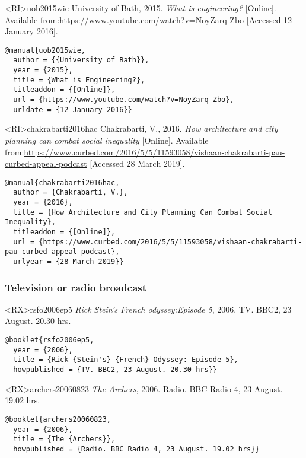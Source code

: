 \documentclass[10pt,a4paper]{article}
\begin{document}
\begin{bibexbox}<RI>{uob2015wie}
   University of Bath, 2015. \emph{What is engineering?} [Online]. Available from:\@ \url{https://www.youtube.com/watch?v=NoyZarq-Zbo} [Accessed 12 January 2016].
  \tcblower
\begin{Verbatim}
@manual{uob2015wie,
  author = {{University of Bath}},
  year = {2015},
  title = {What is Engineering?},
  titleaddon = {[Online]},
  url = {https://www.youtube.com/watch?v=NoyZarq-Zbo},
  urldate = {12 January 2016}}
\end{Verbatim}
\end{bibexbox}

\begin{bibexbox}<RI>{chakrabarti2016hac}
   Chakrabarti, V., 2016. \emph{How architecture and city planning can combat social inequality} [Online]. Available from:\@ \url{https://www.curbed.com/2016/5/5/11593058/vishaan-chakrabarti-pau-curbed-appeal-podcast} [Accessed 28 March 2019].
  \tcblower
\begin{Verbatim}
@manual{chakrabarti2016hac,
  author = {Chakrabarti, V.},
  year = {2016},
  title = {How Architecture and City Planning Can Combat Social Inequality},
  titleaddon = {[Online]},
  url = {https://www.curbed.com/2016/5/5/11593058/vishaan-chakrabarti-pau-curbed-appeal-podcast},
  urlyear = {28 March 2019}}
\end{Verbatim}
\end{bibexbox}

\subsubsection*{Television or radio broadcast}

\begin{bibexbox}<RX>{rsfo2006ep5}
  \emph{Rick Stein's French odyssey:\@ Episode 5}, 2006. TV. BBC2, 23 August. 20.30 hrs.
  \tcblower
\begin{Verbatim}
@booklet{rsfo2006ep5,
  year = {2006},
  title = {Rick {Stein's} {French} Odyssey: Episode 5},
  howpublished = {TV. BBC2, 23 August. 20.30 hrs}}
\end{Verbatim}
\end{bibexbox}

\begin{bibexbox}<RX>{archers20060823}
  \emph{The Archers}, 2006. Radio. BBC Radio 4, 23 August. 19.02 hrs.
  \tcblower
\begin{Verbatim}
@booklet{archers20060823,
  year = {2006},
  title = {The {Archers}},
  howpublished = {Radio. BBC Radio 4, 23 August. 19.02 hrs}}
\end{Verbatim}
\end{bibexbox}
\end{document}
